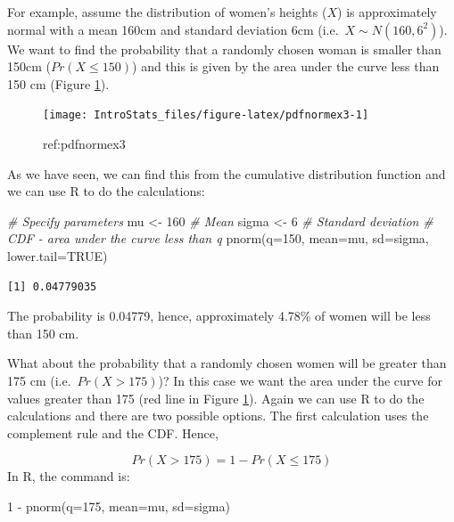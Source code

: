 \documentclass[
  oneside]{krantz}
\newenvironment{Shaded}{\begin{snugshade}}{\end{snugshade}}
\newcommand{\AttributeTok}[1]{\textcolor[rgb]{0.77,0.63,0.00}{#1}}
\newcommand{\CommentTok}[1]{\textcolor[rgb]{0.56,0.35,0.01}{\textit{#1}}}
\newcommand{\ConstantTok}[1]{\textcolor[rgb]{0.00,0.00,0.00}{#1}}
\newcommand{\DecValTok}[1]{\textcolor[rgb]{0.00,0.00,0.81}{#1}}
\newcommand{\FunctionTok}[1]{\textcolor[rgb]{0.00,0.00,0.00}{#1}}
\newcommand{\NormalTok}[1]{#1}
\newcommand{\OtherTok}[1]{\textcolor[rgb]{0.56,0.35,0.01}{#1}}
\newcommand{\SpecialCharTok}[1]{\textcolor[rgb]{0.00,0.00,0.00}{#1}}
\begin{document}
For example, assume the distribution of women's heights (\(X\)) is approximately normal with a mean 160cm and standard deviation 6cm (i.e.~\(X \sim N(160, 6^2)\)). We want to find the probability that a randomly chosen woman is smaller than 150cm (\(Pr(X \le 150)\)) and this is given by the area under the curve less than 150 cm (Figure \ref{fig:pdfnormex3}).



\begin{figure}

{\centering \texttt{[image: IntroStats\_files/figure-latex/pdfnormex3-1]} 

}

\caption{ref:pdfnormex3}\label{fig:pdfnormex3}
\end{figure}

As we have seen, we can find this from the cumulative distribution function and we can use R to do the calculations:

\begin{Shaded}
\begin{Highlighting}[]
\CommentTok{\# Specify parameters}
\NormalTok{mu }\OtherTok{\textless{}{-}} \DecValTok{160} \CommentTok{\# Mean}
\NormalTok{sigma }\OtherTok{\textless{}{-}} \DecValTok{6} \CommentTok{\# Standard deviation}
\CommentTok{\# CDF {-} area under the curve less than q}
\FunctionTok{pnorm}\NormalTok{(}\AttributeTok{q=}\DecValTok{150}\NormalTok{, }\AttributeTok{mean=}\NormalTok{mu, }\AttributeTok{sd=}\NormalTok{sigma, }\AttributeTok{lower.tail=}\ConstantTok{TRUE}\NormalTok{)}
\end{Highlighting}
\end{Shaded}

\begin{verbatim}
[1] 0.04779035
\end{verbatim}

The probability is 0.04779, hence, approximately 4.78\% of women will be less than 150 cm.

What about the probability that a randomly chosen women will be greater than 175 cm (i.e.~\(Pr(X > 175)\))? In this case we want the area under the curve for values greater than 175 (red line in Figure \ref{fig:pdfnormex3}). Again we can use R to do the calculations and there are two possible options. The first calculation uses the complement rule and the CDF. Hence,

\[Pr(X > 175) = 1 - Pr(X \le 175)\]
In R, the command is:

\begin{Shaded}
\begin{Highlighting}[]
\DecValTok{1} \SpecialCharTok{{-}} \FunctionTok{pnorm}\NormalTok{(}\AttributeTok{q=}\DecValTok{175}\NormalTok{, }\AttributeTok{mean=}\NormalTok{mu, }\AttributeTok{sd=}\NormalTok{sigma)}
\end{Highlighting}
\end{Shaded}
\end{document}
